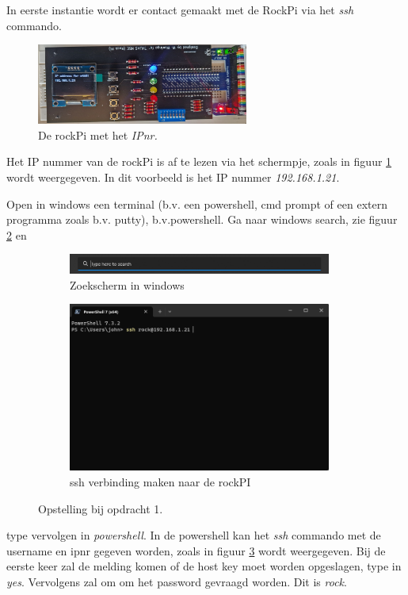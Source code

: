 In eerste instantie wordt er contact gemaakt met de RockPi via het \textit{ssh} commando.
\begin{figure}[h!]
	\centering
	\begin{center} 	
		\includegraphics[width=0.62\textwidth]{figuren/rockIPnr}
		\caption{De rockPi met het \textit{IPnr.}}
		\label{fig:rockpiip}   
	\end{center}
\end{figure}
 Het IP nummer van de rockPi is af te lezen via het schermpje, zoals in figuur \ref{fig:rockpiip} wordt weergegeven. In dit voorbeeld is het IP nummer \textit{192.168.1.21}.


Open in windows een terminal (b.v. een powershell, cmd prompt of een extern programma zoals b.v. putty), b.v.powershell. Ga naar windows search, zie figuur \ref{fig:windowsZk} en
\begin{figure}[h!]
	\centering
	\begin{center} 	
		\begin{subfigure}[b]{0.45\textwidth}
			\includegraphics[width=0.95\textwidth]{figuren/windowsPowerShellSearch}
			\caption{Zoekscherm in windows}
			\label{fig:windowsZk}
		\end{subfigure}
		\begin{subfigure}[b]{0.50\textwidth}
			\includegraphics[width=0.95\textwidth]{figuren/powershell}
			\caption{ssh verbinding maken naar de rockPI }
			\label{fig:sshPi}
		\end{subfigure}
		\caption{Opstelling bij opdracht 1.}
		\label{fig:contactPi}   
	\end{center}
\end{figure}
type vervolgen in \textit{powershell}. In de powershell kan het \textit{ssh} commando met de username en ipnr gegeven worden, zoals in figuur \ref{fig:sshPi} wordt weergegeven. Bij de eerste keer zal de melding komen of de host key moet worden opgeslagen, type in\textit{ yes}. Vervolgens zal om om het password gevraagd worden. Dit is \textit{rock}. 

